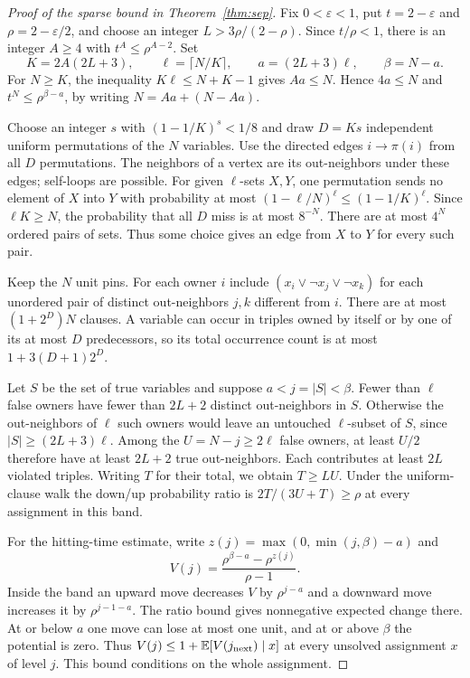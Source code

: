 \documentclass[11pt,a4paper]{article}
\theoremstyle{definition}
\theoremstyle{remark}
\newcommand{\E}{\mathbb{E}}
\begin{document}
\begin{proof}[Proof of the sparse bound in Theorem~\ref{thm:sep}]
Fix $0<\varepsilon<1$, put $t=2-\varepsilon$ and $\rho=2-\varepsilon/2$, and choose an integer $L>3\rho/(2-\rho)$. Since $t/\rho<1$, there is an integer $A\ge4$ with $t^A\le\rho^{A-2}$. Set
\[
 K=2A(2L+3),\qquad \ell=\lceil N/K\rceil,\qquad a=(2L+3)\ell,\qquad \beta=N-a.
\]
For $N\ge K$, the inequality $K\ell\le N+K-1$ gives $Aa\le N$. Hence $4a\le N$ and $t^N\le\rho^{\beta-a}$, by writing $N=Aa+(N-Aa)$.

Choose an integer $s$ with $(1-1/K)^s<1/8$ and draw $D=Ks$ independent uniform permutations of the $N$ variables. Use the directed edges $i\to\pi(i)$ from all $D$ permutations. The neighbors of a vertex are its out-neighbors under these edges; self-loops are possible. For given $\ell$-sets $X,Y$, one permutation sends no element of $X$ into $Y$ with probability at most $(1-\ell/N)^\ell\le(1-1/K)^\ell$. Since $\ell K\ge N$, the probability that all $D$ miss is at most $8^{-N}$. There are at most $4^N$ ordered pairs of sets. Thus some choice gives an edge from $X$ to $Y$ for every such pair.

Keep the $N$ unit pins. For each owner $i$ include $(x_i\lor\neg x_j\lor\neg x_k)$ for each unordered pair of distinct out-neighbors $j,k$ different from $i$. There are at most $(1+2^D)N$ clauses. A variable can occur in triples owned by itself or by one of its at most $D$ predecessors, so its total occurrence count is at most $1+3(D+1)2^D$.

Let $S$ be the set of true variables and suppose $a<j=|S|<\beta$. Fewer than $\ell$ false owners have fewer than $2L+2$ distinct out-neighbors in $S$. Otherwise the out-neighbors of $\ell$ such owners would leave an untouched $\ell$-subset of $S$, since $|S|\ge(2L+3)\ell$. Among the $U=N-j\ge 2\ell$ false owners, at least $U/2$ therefore have at least $2L+2$ true out-neighbors. Each contributes at least $2L$ violated triples. Writing $T$ for their total, we obtain $T\ge LU$. Under the uniform-clause walk the down/up probability ratio is $2T/(3U+T)\ge\rho$ at every assignment in this band.

For the hitting-time estimate, write $z(j)=\max(0,\min(j,\beta)-a)$ and
\[
 V(j)=\frac{\rho^{\beta-a}-\rho^{z(j)}}{\rho-1}.
\]
Inside the band an upward move decreases $V$ by $\rho^{j-a}$ and a downward move increases it by $\rho^{j-1-a}$. The ratio bound gives nonnegative expected change there. At or below $a$ one move can lose at most one unit, and at or above $\beta$ the potential is zero. Thus $V(j)\le1+\E[V(j_{\rm next})\mid x]$ at every unsolved assignment $x$ of level $j$. This bound conditions on the whole assignment.


\end{proof}
\end{document}
